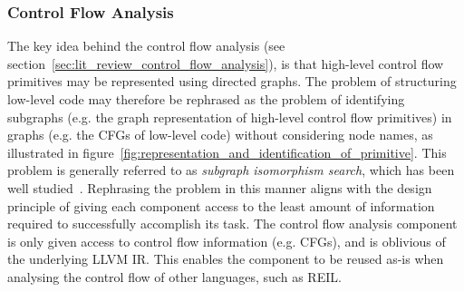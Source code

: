 
\subsubsection{Control Flow Analysis}
\label{sec:design_control_flow_analysis}

The key idea behind the control flow analysis (see section~\ref{sec:lit_review_control_flow_analysis}), is that high-level control flow primitives may be represented using directed graphs. The problem of structuring low-level code may therefore be rephrased as the problem of identifying subgraphs (e.g. the graph representation of high-level control flow primitives) in graphs (e.g. the CFGs of low-level code) without considering node names, as illustrated in figure~\ref{fig:representation_and_identification_of_primitive}. This problem is generally referred to as \textit{subgraph isomorphism search}, which has been well studied~\cite{subgraph_isomorphism_algorithms}. Rephrasing the problem in this manner aligns with the design principle of giving each component access to the least amount of information required to successfully accomplish its task. The control flow analysis component is only given access to control flow information (e.g. CFGs), and is oblivious of the underlying LLVM IR. This enables the component to be reused as-is when analysing the control flow of other languages, such as REIL.

